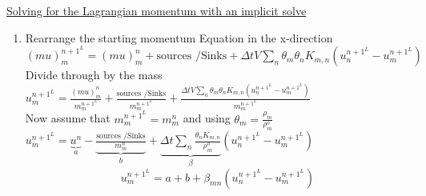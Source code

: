 \documentclass[fleqn]{article}
\begin{document}
\newpage
\underline{Solving for the Lagrangian momentum with an implicit solve}

\begin{enumerate}
\item Rearrange the starting momentum Equation in the x-direction \\
$    (mu)^{n+1^{L}}_m 
    = (m u)_m^{n}
    + \text{sources /Sinks}
    + \Delta{t} V \sum_n \theta_m \theta_n K_{m,n} (u_n^{n+1^{L}} - u_m^{n+1^{L}})
$\\
Divide through by the mass\\
$    u^{n+1^{L}}_m 
    = \frac{(m u)_m^{n} }{m^{n+1^{L}}_m}
    + \frac{\text{sources /Sinks} }{m^{n+1^{L}}_m}
    + \frac{\Delta{t} V \sum_n \theta_m \theta_n K_{m,n} (u_n^{n+1^{L}} - u_m^{n+1^{L}})}{m^{n+1^{L}}_m}
$\\ 
Now assume that $m^{n+1^{L}}_m = m^{n}_m$ and using $\theta_m = \frac{\rho_m}{\rho^o_m}$\\
$    u^{n+1^{L}}_m 
    = \underbrace{ u^{n}  }_a
    - \underbrace{\frac{\text{sources /Sinks} }{m^{n}_m}}_b
    + \underbrace{\Delta{t}\sum_n \frac{\theta_n K_{m,n}}{\rho^o_m} }_\beta  (u_n^{n+1^{L}} - u_m^{n+1^{L}})
$
\[
    u^{n+1^{L}}_m 
    = a
    + b
    + \beta_{mn}  (u_n^{n+1^{L}} - u_m^{n+1^{L}})
\]


\end{enumerate}
\end{document}
